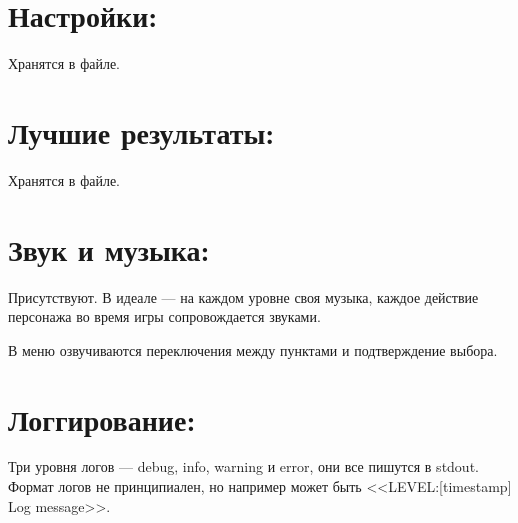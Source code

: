 \documentclass[12pt,a4paper]{article}
\begin{document}
\section{Настройки:}
Хранятся в файле.\\

\section{Лучшие результаты:}
Хранятся в файле.\\

\section{Звук и музыка:}
Присутствуют. В идеале --- на каждом уровне своя музыка, каждое действие персонажа во время игры сопровождается звуками.

В меню озвучиваются переключения между пунктами и подтверждение выбора.\\

\section{Логгирование:}
Три уровня логов --- debug, info, warning и error, они все пишутся в stdout. Формат логов не принципиален, но например может быть <<LEVEL:[timestamp] Log message>>.\\
\end{document}

